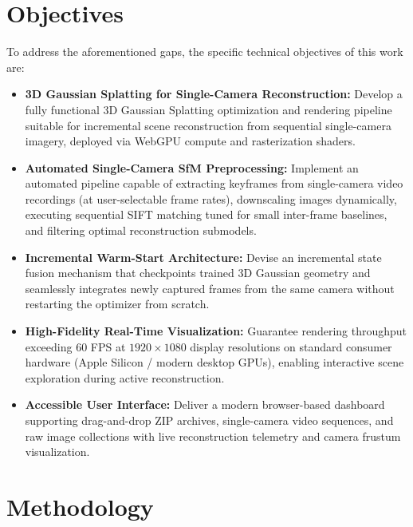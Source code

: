 \documentclass[conference]{IEEEtran}
\begin{document}
\section{Objectives}
To address the aforementioned gaps, the specific technical objectives of this work are:
\begin{itemize}
    \item \textbf{3D Gaussian Splatting for Single-Camera Reconstruction:} Develop a fully functional 3D Gaussian Splatting optimization and rendering pipeline suitable for incremental scene reconstruction from sequential single-camera imagery, deployed via WebGPU compute and rasterization shaders.
    \item \textbf{Automated Single-Camera SfM Preprocessing:} Implement an automated pipeline capable of extracting keyframes from single-camera video recordings (at user-selectable frame rates), downscaling images dynamically, executing sequential SIFT matching tuned for small inter-frame baselines, and filtering optimal reconstruction submodels.
    \item \textbf{Incremental Warm-Start Architecture:} Devise an incremental state fusion mechanism that checkpoints trained 3D Gaussian geometry and seamlessly integrates newly captured frames from the same camera without restarting the optimizer from scratch.
    \item \textbf{High-Fidelity Real-Time Visualization:} Guarantee rendering throughput exceeding 60 FPS at $1920\times 1080$ display resolutions on standard consumer hardware (Apple Silicon / modern desktop GPUs), enabling interactive scene exploration during active reconstruction.
    \item \textbf{Accessible User Interface:} Deliver a modern browser-based dashboard supporting drag-and-drop ZIP archives, single-camera video sequences, and raw image collections with live reconstruction telemetry and camera frustum visualization.
\end{itemize}

\section{Methodology}
\end{document}
